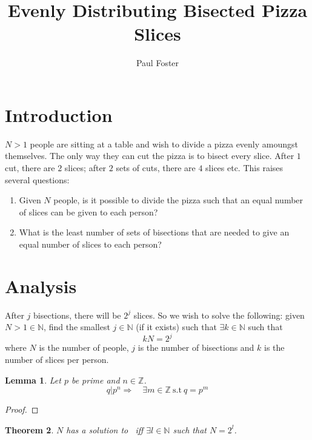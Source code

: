 \documentclass{article}
\title{Evenly Distributing Bisected Pizza Slices}
\author{Paul Foster}
\begin{document}
\maketitle

\newtheorem{theorem}{Theorem}
\newtheorem{corollary}{Corollary}[theorem]
\newtheorem{lemma}[theorem]{Lemma}

\section{Introduction}
$N>1$ people are sitting at a table and wish to divide a pizza evenly amoungst themselves. The only way they can cut the pizza is to bisect every slice. After $1$ cut, there are $2$ slices; after $2$ sets of cuts, there are $4$ slices etc. This raises several questions:
\begin{enumerate}
  \item Given $N$ people, is it possible to divide the pizza such that an equal number of slices can be given to each person?
  \item What is the least number of sets of bisections that are needed to give an equal number of slices to each person?
\end{enumerate}

\section{Analysis}
After $j$ bisections, there will be $2^j$ slices. So we wish to solve the following: given $N>1 \in \mathbb{N}$, find the smallest $j \in \mathbb{N}$ (if it exists) such that $\exists k \in \mathbb{N}$ such that
\begin{equation} \label{eq:1}
  kN = 2^j
\end{equation}
where $N$ is the number of people, $j$ is the number of bisections and $k$ is the number of slices per person.

\begin{lemma} \label{lem:1}
Let $p$ be prime and $n \in \mathbb{Z}$.
\begin{equation}
  q | p^n \Rightarrow\quad \exists m \in \mathbb{Z}~\text{s.t}~q = p^m
\end{equation}
\end{lemma}

\begin{proof}
\end{proof}

\begin{theorem} \label{the:1}
$N$ has a solution to~ iff $\exists l \in \mathbb{N}$ such that $N = 2^l$.
\end{theorem}
\end{document}
